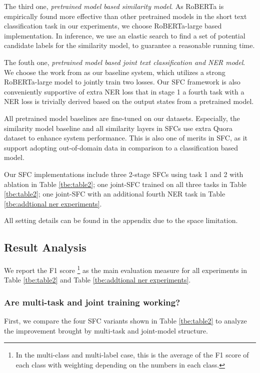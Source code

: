 The third one, \emph{pretrained model based similarity model}. 
As RoBERTa is empirically found more effective than other pretrained models in the short text classification task in our experiments, we choose RoBERTa-large based implementation.
In inference, we use an elastic search to find a set of potential candidate labels for the similarity model, to guarantee a reasonable running time.

The fouth one, \emph{pretrained model based joint text classification and NER model}. 
We choose the work from \cite{chen2019bert} as our baseline system, which utilizes a strong RoBERTa-large model to jointly train two losses.
Our SFC framework is also conveniently supportive of extra NER loss that in stage 1 a fourth task with a NER loss is trivially derived based on the output states from a pretrained model.

All pretrained model baselines are fine-tuned on our datasets.
Especially, the similarity model baseline and all similarity layers in SFCs use extra Quora dataset \cite{iyer2017first} to enhance system performance. 
This is also one of merits in SFC, as it support adopting out-of-domain data in comparison to a classification based model.

Our SFC implementations include three 2-stage SFCs using task 1 and 2 with ablation in Table \ref{tbe:table2}; one joint-SFC trained on all three tasks in Table \ref{tbe:table2}; one joint-SFC with an additional fourth NER task in Table \ref{tbe:addtional ner experiments}. 

All setting details can be found in the appendix due to the space limitation.

\subsection{Result Analysis}
We report the F1 score \footnote{In the multi-class and multi-label case, this
is the average of the F1 score of each class with weighting depending on the
numbers in each class.} as the main evaluation measure for all experiments in
Table \ref{tbe:table2} and Table \ref{tbe:addtional ner experiments}.

\subsubsection*{Are multi-task and joint training working?} 
First, we compare the four SFC variants shown in Table \ref{tbe:table2} to analyze the improvement
brought by multi-task and joint-model structure. 

